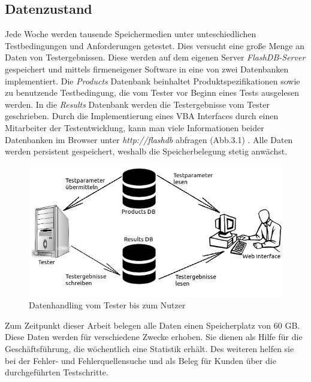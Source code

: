 \subsection{Datenzustand}
Jede Woche werden tausende Speichermedien unter unteschiedlichen Testbedingungen und Anforderungen getestet. Dies versucht eine große Menge an Daten von Testergebnissen. Diese werden auf dem eigenen Server \textit{FlashDB-Server} gespeichert und mittels firmeneigener Software in eine von zwei Datenbanken implementiert. Die \textit{Products} Datenbank beinhaltet Produktspezifikationen sowie zu benutzende Testbedingung, die vom Tester vor Beginn eines Tests ausgelesen werden. In die \textit{Results} Datenbank werden die Testergebnisse vom Tester geschrieben. Durch die Implementierung eines VBA Interfaces durch einen Mitarbeiter der Testentwicklung, kann man viele Informationen beider Datenbanken im Browser unter \textit{http://flashdb} abfragen (Abb.3.1) . Alle Daten werden persistent gespeichert, weshalb die Speicherbelegung stetig anwächst. 
\begin{figure}
\centering
\includegraphics[scale=0.6]{images/flashdb01}
\caption{Datenhandling vom Tester bis zum Nutzer}
\label{fig:Datenaustausch}
\end{figure}
Zum Zeitpunkt dieser Arbeit belegen alle Daten einen Speicherplatz von 60 GB. Diese Daten werden für verschiedene Zwecke erhoben. Sie dienen als Hilfe für die Geschäftsführung, die wöchentlich eine Statistik erhält. Des weiteren helfen sie bei der Fehler- und Fehlerquellensuche und als Beleg für Kunden über die durchgeführten Testschritte. 
	
	\vspace{5mm}
	
